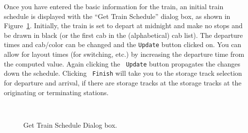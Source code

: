 Once you have entered the basic information for the train, an initial
train schedule is displayed with the ``Get Train Schedule'' dialog box,
as shown in Figure~\ref{fig:getTrainScheduleDialog}.  Initially, the
train is set to depart at midnight and make no stops and be drawn in
black (or the first cab in the (alphabetical) cab list).  The departure
times and cab/color can be changed and the {\tt Update} button clicked
on.  You can allow for layout times (for switching, etc.) by increasing
the departure time from the computed value.  Again clicking the {\tt
Update} button propagates the changes down the schedule.  Clicking {\tt
Finish} will take you to the storage track selection for departure and
arrival, if there are storage tracks at the storage tracks at the
originating or terminating stations.

\begin{figure}
\begin{centering}
\\
\caption{Get Train Schedule Dialog box.}
\label{fig:getTrainScheduleDialog}
\end{centering}
\end{figure}



